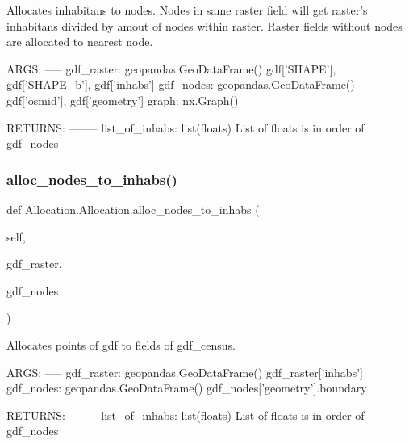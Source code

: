 \begin{DoxyVerb}Allocates inhabitans to nodes. Nodes in same raster field will get
raster's inhabitans divided by amout of nodes within raster. Raster
fields without nodes are allocated to nearest node.

ARGS:
-----
gdf_raster: geopandas.GeoDataFrame()
    gdf['SHAPE'], gdf['SHAPE_b'], gdf['inhabs']
gdf_nodes: geopandas.GeoDataFrame()
    gdf['osmid'], gdf['geometry']
graph: nx.Graph()

RETURNS:
--------
list_of_inhabs: list(floats)
    List of floats is in order of gdf_nodes
\end{DoxyVerb}
 \mbox{\label{class_allocation_1_1_allocation_a2ca842ec76eda148406d56cf0d4153d8}} 
\subsubsection{\texorpdfstring{alloc\+\_\+nodes\+\_\+to\+\_\+inhabs()}{alloc\_nodes\_to\_inhabs()}}
{\footnotesize\ttfamily def Allocation.\+Allocation.\+alloc\+\_\+nodes\+\_\+to\+\_\+inhabs (\begin{DoxyParamCaption}\item[{}]{self,  }\item[{}]{gdf\+\_\+raster,  }\item[{}]{gdf\+\_\+nodes }\end{DoxyParamCaption})}

\begin{DoxyVerb}Allocates points of gdf to fields of gdf_census.

ARGS:
-----
gdf_raster: geopandas.GeoDataFrame()
    gdf_raster['inhabs']
gdf_nodes: geopandas.GeoDataFrame()
    gdf_nodes['geometry'].boundary

RETURNS:
--------
list_of_inhabs: list(floats)
    List of floats is in order of gdf_nodes
\end{DoxyVerb}
 \mbox{\label{class_allocation_1_1_allocation_a5bd469a67d08d5b69e45fb6a3c74fda6}} 
